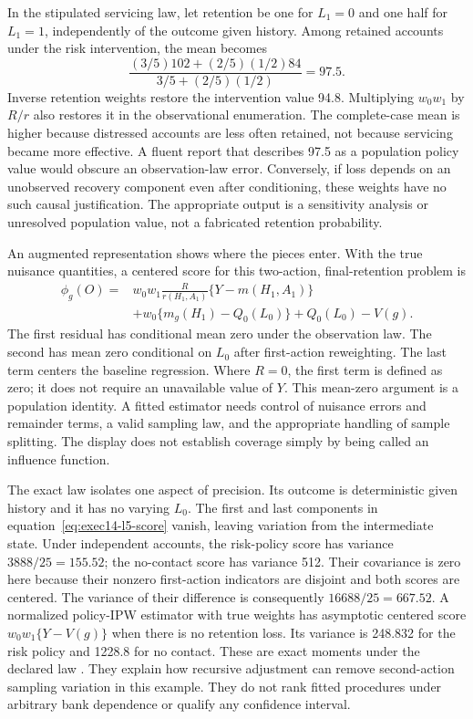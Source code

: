In the stipulated servicing law, let retention be one for $L_1=0$ and one half
for $L_1=1$, independently of the outcome given history. Among retained accounts
under the risk intervention, the mean becomes
\[
 \frac{(3/5)102+(2/5)(1/2)84}{3/5+(2/5)(1/2)}=97.5.
\]
Inverse retention weights restore the intervention value 94.8. Multiplying
$w_0w_1$ by $R/r$ also restores it in the observational enumeration. The
complete-case mean is higher because distressed accounts are less often
retained, not because servicing became more effective. A fluent report that
describes 97.5 as a population policy value would obscure an observation-law
error. Conversely, if loss depends on an unobserved recovery component even
after conditioning, these weights have no such causal justification. The
appropriate output is a sensitivity analysis or unresolved population value,
not a fabricated retention probability.

An augmented representation shows where the pieces enter. With the true
nuisance quantities, a centered score for this two-action, final-retention
problem is
\begin{align}
 \phi_g(O)={}&w_0w_1\frac{R}{r(H_1,A_1)}
          \{Y-m(H_1,A_1)\}\nonumber\\
 &+w_0\{m_g(H_1)-Q_0(L_0)\}+Q_0(L_0)-V(g).
 \label{eq:exec14-l5-score}
\end{align}
The first residual has conditional mean zero under the observation law. The
second has mean zero conditional on $L_0$ after first-action reweighting.
The last term centers the baseline regression. Where $R=0$, the first term
is defined as zero; it does not require an unavailable value of $Y$. This
mean-zero argument is a population identity. A fitted estimator needs control
of nuisance errors and remainder terms, a valid sampling law, and the
appropriate handling of sample splitting. The display does not establish
coverage simply by being called an influence function.

The exact law isolates one aspect of precision. Its outcome is deterministic
given history and it has no varying $L_0$. The first and last components in
equation~\eqref{eq:exec14-l5-score} vanish, leaving variation from the intermediate
state. Under independent accounts, the risk-policy score has variance
$3888/25=155.52$; the no-contact score has variance 512. Their covariance is
zero here because their nonzero first-action indicators are disjoint and both
scores are centered. The variance of their difference is consequently
$16688/25=667.52$. A normalized policy-IPW estimator with true weights has
asymptotic centered score $w_0w_1\{Y-V(g)\}$ when there is no retention loss.
Its variance is 248.832 for the risk policy and 1228.8 for no contact.
These are exact moments under the declared law
\cite{exec14_workflow_oracle}. They explain how recursive adjustment can remove
second-action sampling variation in this example. They do not rank fitted
procedures under arbitrary bank dependence or qualify any confidence interval.

